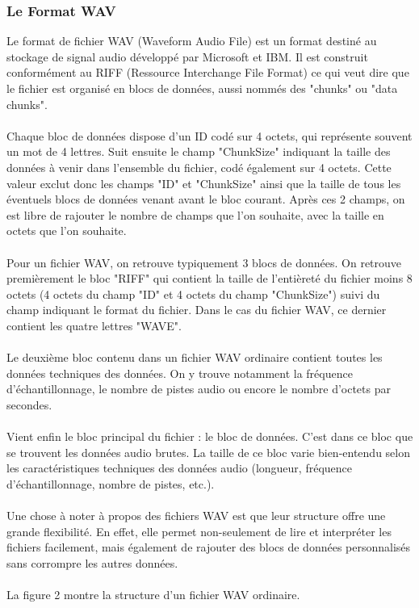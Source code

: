 \documentclass[11pt]{article}
\begin{document}
\subsubsection{Le Format WAV}

Le format de fichier WAV (Waveform Audio File) est un format destiné au stockage de signal audio développé par Microsoft et IBM.
Il est construit conformément au RIFF (Ressource Interchange File Format) ce qui veut dire que le fichier est organisé en blocs de données, aussi nommés des "chunks" ou "data chunks".\\
\\
Chaque bloc de données dispose d'un ID codé sur 4 octets, qui représente souvent un mot de 4 lettres.
Suit ensuite le champ "ChunkSize" indiquant la taille des données à venir dans l'ensemble du fichier, codé également sur 4 octets.
Cette valeur exclut donc les champs "ID" et "ChunkSize" ainsi que la taille de tous les éventuels blocs de données venant avant le bloc courant.
Après ces 2 champs, on est libre de rajouter le nombre de champs que l'on souhaite, avec la taille en octets que l'on souhaite.\\
\\
Pour un fichier WAV, on retrouve typiquement 3 blocs de données.
On retrouve premièrement le bloc "RIFF" qui contient la taille de l'entièreté du fichier moins 8 octets (4 octets du champ "ID" et 4 octets du champ "ChunkSize") suivi du champ indiquant le format du fichier.
Dans le cas du fichier WAV, ce dernier contient les quatre lettres "WAVE".\\
\\
Le deuxième bloc contenu dans un fichier WAV ordinaire contient toutes les données techniques des données.
On y trouve notamment la fréquence d'échantillonnage, le nombre de pistes audio ou encore le nombre d'octets par secondes.\\
\\
Vient enfin le bloc principal du fichier : le bloc de données.
C'est dans ce bloc que se trouvent les données audio brutes.
La taille de ce bloc varie bien-entendu selon les caractéristiques techniques des données audio (longueur, fréquence d'échantillonnage, nombre de pistes, etc.).\\
\\
Une chose à noter à propos des fichiers WAV est que leur structure offre une grande flexibilité.
En effet, elle permet non-seulement de lire et interpréter les fichiers facilement, mais également de rajouter des blocs de données personnalisés sans corrompre les autres données.\\
\\
La figure 2 montre la structure d'un fichier WAV ordinaire.
\end{document}
